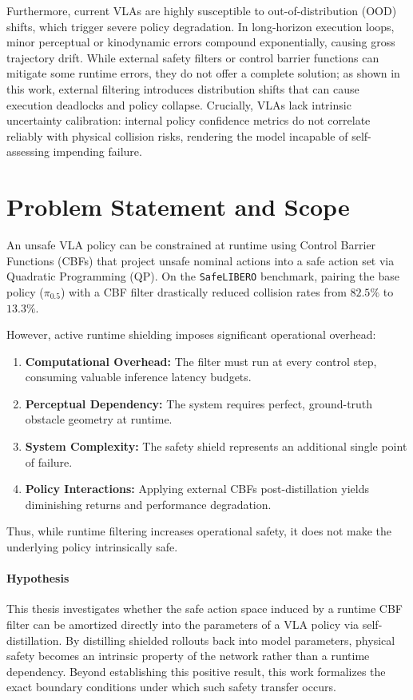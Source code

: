 \documentclass[a4paper,11pt]{report}
\begin{document}
Furthermore, current VLAs are highly susceptible to out-of-distribution (OOD) shifts, which trigger severe policy degradation. In long-horizon execution loops, minor perceptual or kinodynamic errors compound exponentially, causing gross trajectory drift. While external safety filters or control barrier functions can mitigate some runtime errors, they do not offer a complete solution; as shown in this work, external filtering introduces distribution shifts that can cause execution deadlocks and policy collapse. Crucially, VLAs lack intrinsic uncertainty calibration: internal policy confidence metrics do not correlate reliably with physical collision risks, rendering the model incapable of self-assessing impending failure.

\section{Problem Statement and Scope}

An unsafe VLA policy can be constrained at runtime using Control Barrier Functions (CBFs) that project unsafe nominal actions into a safe action set via Quadratic Programming (QP). On the \texttt{SafeLIBERO} benchmark, pairing the base policy ($\pi_{0.5}$) with a CBF filter drastically reduced collision rates from $82.5\%$ to $13.3\%$.

However, active runtime shielding imposes significant operational overhead:
\begin{enumerate}
    \item \textbf{Computational Overhead:} The filter must run at every control step, consuming valuable inference latency budgets.
    \item \textbf{Perceptual Dependency:} The system requires perfect, ground-truth obstacle geometry at runtime.
    \item \textbf{System Complexity:} The safety shield represents an additional single point of failure.
    \item \textbf{Policy Interactions:} Applying external CBFs post-distillation yields diminishing returns and performance degradation.
\end{enumerate}

Thus, while runtime filtering increases operational safety, it does not make the underlying policy intrinsically safe.

\paragraph{Hypothesis}
This thesis investigates whether the safe action space induced by a runtime CBF filter can be amortized directly into the parameters of a VLA policy via self-distillation. By distilling shielded rollouts back into model parameters, physical safety becomes an intrinsic property of the network rather than a runtime dependency. Beyond establishing this positive result, this work formalizes the exact boundary conditions under which such safety transfer occurs.
\end{document}
